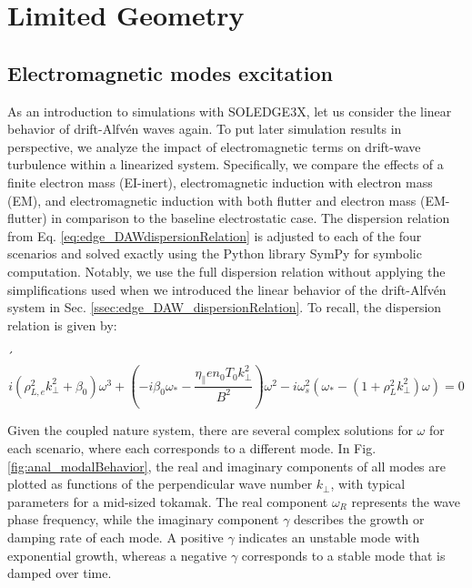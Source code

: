 \chapter{Limited Geometry}
\label{chap:analSimulations}

\section{Electromagnetic modes excitation}
\label{sec:anal_DAW_modeExcitation}

As an introduction to simulations with SOLEDGE3X, let us consider the linear behavior of drift-Alfvén waves again. To put later simulation results in perspective, we analyze the impact of electromagnetic terms on drift-wave turbulence within a linearized system. Specifically, we compare the effects of a finite electron mass (EI-inert), electromagnetic induction with electron mass (EM), and electromagnetic induction with both flutter and electron mass (EM-flutter) in comparison to the baseline electrostatic case. The dispersion relation from Eq. \ref{eq:edge_DAWdispersionRelation} is adjusted to each of the four scenarios and solved exactly using the Python library SymPy for symbolic computation. Notably, we use the full dispersion relation without applying the simplifications used when we introduced the linear behavior of the drift-Alfvén system in Sec. \ref{ssec:edge_DAW_dispersionRelation}. To recall, the dispersion relation is given by: 

´\begin{equation}
	\label{eq:anal_DAWdispersionRelation}
	i\left(\rho_{L,e}^2k_\perp^2 + \beta_0\right)\omega^3 + \left(-i\beta_0\omega_* - \frac{\eta_\parallel en_0T_0k_\perp^2}{B^2}\right)\omega^2 - i\omega_s^2\left(\omega_*-\left(1 + \rho_L^2 k_\perp^2\right)\omega\right) = 0
\end{equation}


Given the coupled nature system, there are several complex solutions for $\omega$ for each scenario, where each corresponds to a different mode. In Fig. \ref{fig:anal_modalBehavior}, the real and imaginary components of all modes are plotted as functions of the perpendicular wave number $k_\perp$, with typical parameters for a mid-sized tokamak. The real component $\omega_R$ represents the wave phase frequency, while the imaginary component $\gamma$ describes the growth or damping rate of each mode. A positive $\gamma$ indicates an unstable mode with exponential growth, whereas a negative $\gamma$ corresponds to a stable mode that is damped over time.

